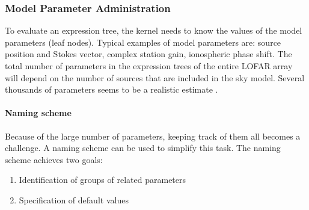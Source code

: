 \documentclass[10pt]{lofar}
\newcommand{\lofar}{LOFAR\xspace}
\begin{document}
\subsubsection{Model Parameter Administration}
\label{subsubsec:admin-model-parms}

To evaluate an expression tree, the kernel needs to know the values of the model
parameters (leaf nodes). Typical examples of model parameters are: source
position and Stokes vector, complex station gain, ionospheric phase shift. The
total number of parameters in the expression trees of the entire \lofar array
will depend on the number of sources that are included in the sky model. Several
thousands of parameters seems to be a realistic estimate
\cite{LOFAR-ASTRON-ADD-015}.

\paragraph{Naming scheme}
Because of the large number of parameters, keeping track of them all becomes a
challenge. A naming scheme can be used to simplify this task. The naming scheme
achieves two goals:
\begin{enumerate}
\item Identification of groups of related parameters
\item Specification of default values
\end{enumerate}
\end{document}
